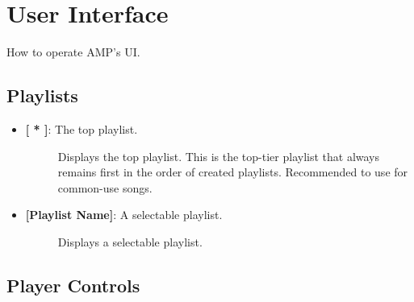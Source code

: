 \documentclass{article}
\begin{document}
\clearpage

\section{User Interface}
\quad How to operate AMP's UI.

\subsection{Playlists}

\begin{itemize}
    \item \textbf{[ * ]}: The top playlist.
    \begin{description}
        \item[] Displays the top playlist. This is the top-tier playlist that always remains first in the order of created playlists. Recommended to use for common-use songs.
    \end{description}
    \item \textbf{[Playlist Name]}: A selectable playlist.
    \begin{description}
        \item[] Displays a selectable playlist.
    \end{description}
\end{itemize}

\subsection{Player Controls}
\end{document}
